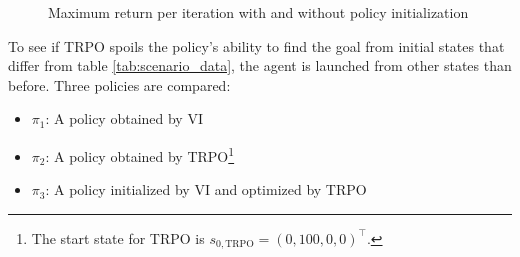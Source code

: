 \begin{figure}[hbt]
	\caption{Maximum return per iteration with and without policy initialization}
	\label{tikz:trpoglorotvi1000mMax}
\end{figure}
\newpage
\FloatBarrier

To see if TRPO spoils the policy's ability to find the goal from initial states that differ from table \ref{tab:scenario_data}, the agent is launched from other states than before. Three policies are compared:

\begin{itemize}
	\item $\pi_1$: A policy obtained by VI
	\item $\pi_2$: A policy obtained by TRPO\footnote{The start state for TRPO is $s_{0,\text{TRPO}}=(0,100,0,0)^\top$.}
	\item $\pi_3$: A policy initialized by VI and optimized by TRPO
\end{itemize}

